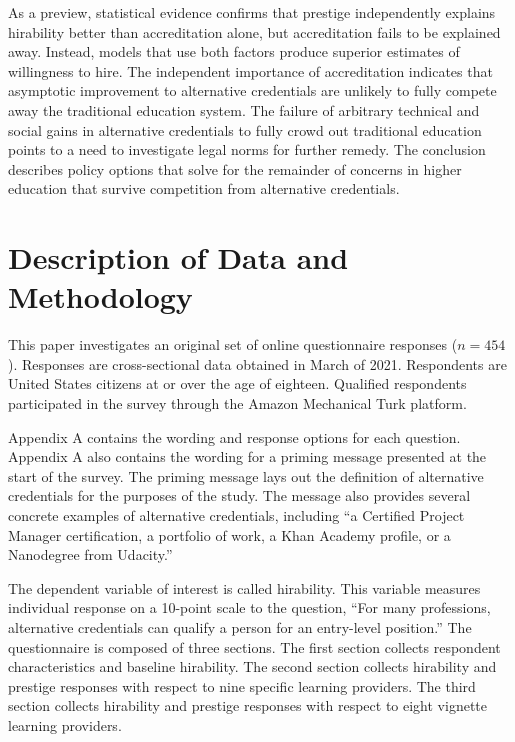 \documentclass[review]{elsarticle}
\begin{document}
As a preview, statistical evidence confirms that prestige independently explains hirability better than accreditation alone,
but accreditation fails to be explained away.
Instead, models that use both factors produce superior estimates of willingness to hire.
The independent importance of accreditation indicates that asymptotic improvement to alternative credentials
are unlikely to fully compete away the traditional education system.
The failure of arbitrary technical and social gains in alternative credentials to fully crowd out traditional education
points to a need to investigate legal norms for further remedy.
The conclusion describes policy options that solve for the remainder of concerns in higher education that survive competition from alternative credentials.

\section{Description of Data and Methodology}

This paper investigates an original set of online questionnaire responses ($n = 454$).
Responses are cross-sectional data obtained in March of 2021.
Respondents are United States citizens at or over the age of eighteen.
Qualified respondents participated in the survey through the Amazon Mechanical Turk platform.

Appendix A contains the wording and response options for each question.
Appendix A also contains the wording for a priming message presented at the start of the survey.
The priming message lays out the definition of alternative credentials for the purposes of the study.
The message also provides several concrete examples of alternative credentials,
including ``a Certified Project Manager certification,
a portfolio of work, a Khan Academy profile, or a Nanodegree from Udacity.''

The dependent variable of interest is called hirability.
This variable measures individual response on a 10-point scale to the question,
``For many professions, alternative credentials can qualify a person for an entry-level position.''
The questionnaire is composed of three sections.
The first section collects respondent characteristics and baseline hirability.
The second section collects hirability and prestige responses with respect to nine specific learning providers.
The third section collects hirability and prestige responses with respect to eight vignette learning providers.
\end{document}
